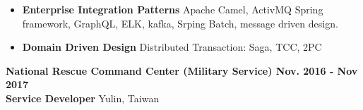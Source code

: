 \documentclass{res}
\begin{document}
\begin{resume}
\begin{itemize}
				    \item \textbf{Enterprise Integration Patterns}
				    \subitem Apache Camel, ActivMQ
				    \subitem Spring framework, GraphQL, ELK, kafka, Srping Batch, message driven design.
				    \item \textbf{Domain Driven Design}
				    \subitem Distributed Transaction: Saga, TCC, 2PC
	
				\end{itemize}

				{\hfill {\bf National Rescue Command Center (Military Service) \hspace{1cm} Nov. 2016 - Nov 2017}\\
				{\bf Service Developer}   {\hfill Yulin, Taiwan}
				\\

}
\end{resume}
\end{document}
